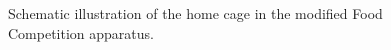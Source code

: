 \documentclass[english, a4paper, 11pt]{article}
\begin{document}
\begin{figure}[h]
    \centering
    \caption{Schematic illustration of the home cage in the modified Food Competition apparatus.}
    \label{fig:modified_apparatus}
\end{figure}
\end{document}
